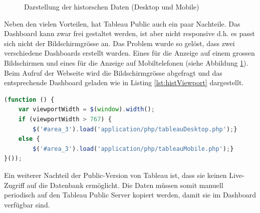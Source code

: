 

\begin{figure}[h!]
	\centering
	\caption{Darstellung der historschen Daten (Desktop und Mobile)}
	\label{img:tableau}
\end{figure}


\noindent
Neben den vielen Vorteilen, hat Tableau Public auch ein paar Nachteile. Das Dashboard kann zwar frei gestaltet werden, ist aber nicht responsive d.h. es passt sich nicht der Bildschirmgrösse an. Das Problem wurde so gelöst, dass zwei verschiedene Dashboards erstellt wurden. Eines für die Anzeige auf einem grossen Bildschirmen und eines für die Anzeige auf Mobiltelefonen (siehe Abbildung \ref{img:tableau}). Beim Aufruf der Webseite wird die Bildschirmgrösse abgefragt und das entsprechende Dashboard geladen wie in Listing \ref{lst:histViewport} dargestellt.

\vspace{3mm}
\begin{lstlisting}[label=lst:histViewport,caption=Auswahl des Dashboards anhand der Bildschirmgrösse, language=JavaScript, style=htmlcssjs]
(function () {
	var viewportWidth = $(window).width();
	if (viewportWidth > 767) {
		$('#area_3').load('application/php/tableauDesktop.php');}
	else {
		$('#area_3').load('application/php/tableauMobile.php');}
}());
\end{lstlisting}
\vspace{3mm}

\noindent
Ein weiterer Nachteil der Public-Version von Tableau ist, dass sie keinen Live-Zugriff auf die Datenbank ermöglicht. Die Daten müssen somit manuell periodisch auf den Tableau Public Server kopiert werden, damit sie im Dashboard verfügbar sind.



